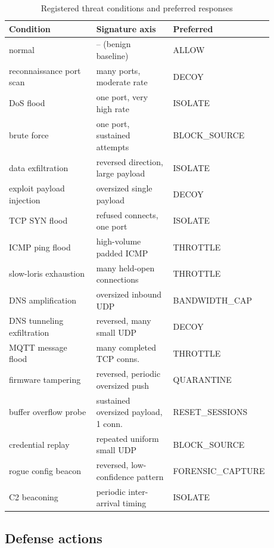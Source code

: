 \documentclass[conference]{IEEEtran}
\begin{document}
\begin{table}[t]
\centering
\caption{Registered threat conditions and preferred responses}
\label{tab:attacks}
\scriptsize
\setlength{\tabcolsep}{3pt}
\begin{tabular}{@{}p{0.34\linewidth}p{0.30\linewidth}p{0.24\linewidth}@{}}
\toprule
\textbf{Condition} & \textbf{Signature axis} & \textbf{Preferred} \\
\midrule
normal & -- (benign baseline) & ALLOW \\
reconnaissance port scan & many ports, moderate rate & DECOY \\
DoS flood & one port, very high rate & ISOLATE \\
brute force & one port, sustained attempts & BLOCK\allowbreak\_SOURCE \\
data exfiltration & reversed direction, large payload & ISOLATE \\
exploit payload injection & oversized single payload & DECOY \\
TCP SYN flood & refused connects, one port & ISOLATE \\
ICMP ping flood & high-volume padded ICMP & THROTTLE \\
slow-loris exhaustion & many held-open connections & THROTTLE \\
DNS amplification & oversized inbound UDP & BANDWIDTH\allowbreak\_CAP \\
DNS tunneling exfiltration & reversed, many small UDP & DECOY \\
MQTT message flood & many completed TCP conns. & THROTTLE \\
firmware tampering & reversed, periodic oversized push & QUARANTINE \\
buffer overflow probe & sustained oversized payload, 1 conn. & RESET\allowbreak\_SESSIONS \\
credential replay & repeated uniform small UDP & BLOCK\allowbreak\_SOURCE \\
rogue config beacon & reversed, low-confidence pattern & FORENSIC\allowbreak\_CAPTURE \\
C2 beaconing & periodic inter-arrival timing & ISOLATE \\
\bottomrule
\end{tabular}
\end{table}

\subsection{Defense actions}
\end{document}
